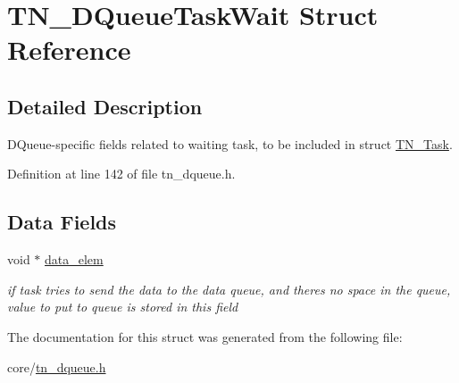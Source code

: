 \hypertarget{structTN__DQueueTaskWait}{}\section{T\+N\+\_\+\+D\+Queue\+Task\+Wait Struct Reference}
\label{structTN__DQueueTaskWait}


\subsection{Detailed Description}
D\+Queue-\/specific fields related to waiting task, to be included in struct \hyperlink{structTN__Task}{T\+N\+\_\+\+Task}. 

Definition at line 142 of file tn\+\_\+dqueue.\+h.

\subsection*{Data Fields}
\begin{DoxyCompactItemize}
\item 
\mbox{\label{structTN__DQueueTaskWait_aa3dd6acde9f906208285e539e7c1949d}} 
void $\ast$ \hyperlink{structTN__DQueueTaskWait_aa3dd6acde9f906208285e539e7c1949d}{data\+\_\+elem}
\begin{DoxyCompactList}\small\item\em if task tries to send the data to the data queue, and there\textquotesingle{}s no space in the queue, value to put to queue is stored in this field \end{DoxyCompactList}\end{DoxyCompactItemize}


The documentation for this struct was generated from the following file\+:\begin{DoxyCompactItemize}
\item 
core/\hyperlink{tn__dqueue_8h}{tn\+\_\+dqueue.\+h}\end{DoxyCompactItemize}
